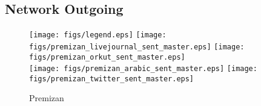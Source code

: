 \documentclass{article}
\newcommand{\bline}[1][1]{\vspace{#1\baselineskip}}
\begin{document}
\pagebreak
\subsection{Network Outgoing}
\begin{figure}[!h]
  \bline[1]
  \centering
  \texttt{[image: figs/legend.eps]}\hspace{3em}%
  \texttt{[image: figs/premizan\_livejournal\_sent\_master.eps]}\hspace{1em}%
  \texttt{[image: figs/premizan\_orkut\_sent\_master.eps]}\\
  \texttt{[image: figs/premizan\_arabic\_sent\_master.eps]}\hspace{1em}%
  \texttt{[image: figs/premizan\_twitter\_sent\_master.eps]}
  \caption{Premizan}
\end{figure}
\end{document}
